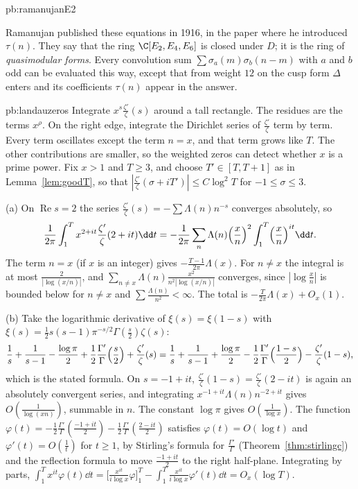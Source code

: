 \begin{solution}{pb:ramanujanE2}

\leads Ramanujan published these equations in 1916, in the paper where he introduced $\tau(n)$. They say that the ring $\C[E_2,E_4,E_6]$ is closed under $D$; it is the ring of
\emph{quasimodular forms}. Every convolution sum $\sum\sigma_a(m)\sigma_b(n-m)$ with $a$ and $b$ odd can be evaluated this way, except that from weight $12$ on the cusp form $\Delta$
enters and its coefficients $\tau(n)$ appear in the answer.
\end{solution}

\begin{solution}{pb:landauzeros}
\idea Integrate $x^s\frac{\zeta'}\zeta(s)$ around a tall rectangle. The residues are the terms $x^\rho$. On the right edge, integrate the Dirichlet series of $\frac{\zeta'}\zeta$ term by term. Every term oscillates except the term $n=x$, and that term grows like $T$. The other contributions are smaller, so the weighted zeros can detect whether $x$ is a prime power.
\writeup Fix $x>1$ and $T\ge3$, and choose $T'\in[T,T+1]$ as in Lemma~\ref{lem:goodT}, so that $|\frac{\zeta'}\zeta(\sigma+iT')|\le C\log^2T$ for $-1\le\sigma\le3$.

(a) On $\operatorname{Re}s=2$ the series $\frac{\zeta'}\zeta(s)=-\sum\Lambda(n)n^{-s}$ converges absolutely, so
\[
\frac1{2\pi}\int_1^Tx^{2+it}\frac{\zeta'}\zeta(2+it)\dd t=-\frac1{2\pi}\sum_n\Lambda(n)\Bigl(\frac xn\Bigr)^2\int_1^T\Bigl(\frac xn\Bigr)^{it}\dd t.
\]
The term $n=x$ (if $x$ is an integer) gives $-\frac{T-1}{2\pi}\Lambda(x)$. For $n\ne x$ the integral is at most $\frac2{|\log(x/n)|}$, and $\sum_{n\ne x}\Lambda(n)\frac{x^2}{n^2|\log(x/n)|}$
converges, since $|\log\frac xn|$ is bounded below for $n\ne x$ and $\sum\frac{\Lambda(n)}{n^2}<\infty$. The total is $-\frac T{2\pi}\Lambda(x)+O_x(1)$.

(b) Take the logarithmic derivative of $\xi(s)=\xi(1-s)$ with $\xi(s)=\frac12s(s-1)\pi^{-s/2}\Gamma(\frac s2)\zeta(s)$:
\[
\frac1s+\frac1{s-1}-\frac{\log\pi}2+\frac12\frac{\Gamma'}\Gamma\Bigl(\frac s2\Bigr)+\frac{\zeta'}\zeta(s)=\frac1s+\frac1{s-1}+\frac{\log\pi}2-\frac12\frac{\Gamma'}\Gamma\Bigl(\frac{1-s}2\Bigr)-\frac{\zeta'}\zeta(1-s),
\]
which is the stated formula. On $s=-1+it$, $\frac{\zeta'}\zeta(1-s)=\frac{\zeta'}\zeta(2-it)$ is again an absolutely convergent series, and integrating $x^{-1+it}\Lambda(n)n^{-2+it}$ gives
$O(\frac1{\log(xn)})$, summable in $n$. The constant $\log\pi$ gives $O(\frac1{\log x})$. The function $\varphi(t)=-\frac12\frac{\Gamma'}\Gamma(\frac{-1+it}2)-\frac12\frac{\Gamma'}\Gamma(\frac{2-it}2)$ satisfies
$\varphi(t)=O(\log t)$ and $\varphi'(t)=O(\frac1t)$ for $t\ge1$, by Stirling's formula for $\frac{\Gamma'}\Gamma$ (Theorem~\ref{thm:stirlingc}) and the reflection formula to move
$\frac{-1+it}2$ to the right half-plane. Integrating by parts,
$\int_1^{T}x^{it}\varphi(t)\dd t=\bigl[\frac{x^{it}}{i\log x}\varphi\bigr]_1^{T}-\int_1^{T}\frac{x^{it}}{i\log x}\varphi'(t)\dd t=O_x(\log T)$.


\end{solution}
